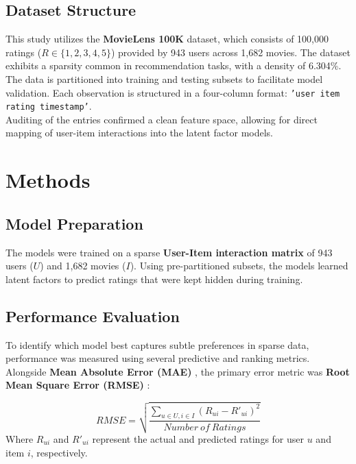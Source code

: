 \documentclass[conference]{IEEEtran}
\begin{document}
\subsection{\textbf{Dataset Structure}}
\indent This study utilizes the \textbf{MovieLens 100K}\cite{harper2015movielens} dataset, which consists of 100,000 ratings ($R \in \{1, 2, 3, 4, 5\}$) provided by 943 users across 1,682 movies. The dataset exhibits a sparsity common in recommendation tasks, with a density of 6.304\%.\\ 
\indent The data is partitioned into training and testing subsets to facilitate model validation. Each observation is structured in a four-column format: \texttt{'user item rating timestamp'}.\\ 
\indent Auditing of the entries confirmed a clean feature space, allowing for direct mapping of user-item interactions into the latent factor models.

\vspace{4mm}

\section{\textbf{Methods}}

\subsection{\textbf{Model Preparation}}

The models were trained on a sparse \textbf{User-Item interaction matrix} \cite{harper2015movielens} of 943 users ($U$) and 1,682 movies ($I$). Using pre-partitioned subsets, the models learned latent factors to predict ratings that were kept hidden during training.

\vspace{2mm}

\subsection{\textbf{Performance Evaluation}}
To identify which model best captures subtle preferences in sparse data, performance was measured using several predictive and ranking metrics. Alongside \textbf{Mean Absolute Error (MAE)} \cite{ISLR2}, the primary error metric was \textbf{Root Mean Square Error (RMSE)} \cite{harper2015movielens}:

\begin{equation}
	RMSE = \sqrt{\frac{\sum_{u \in U, i \in I} (R_{ui} - R'_{ui})^2}{Number \ of \ Ratings}}
\end{equation} 
Where $R_{ui}$ and $R'_{ui}$ represent the actual and predicted ratings for user $u$ and item $i$, respectively. 
\end{document}
